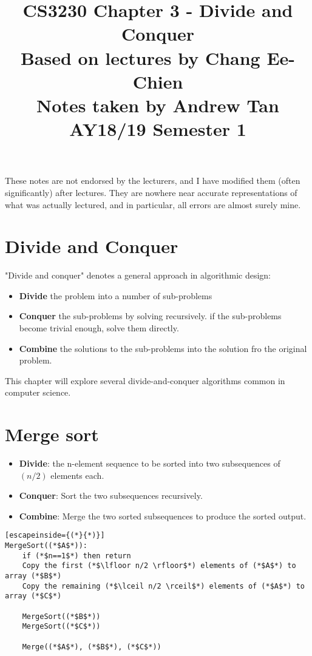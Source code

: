 \documentclass[a4paper]{article}
\title{%
	CS3230 Chapter 3 - Divide and Conquer \\
	\large Based on lectures by Chang Ee-Chien
	\\ Notes taken by Andrew Tan
	\\ AY18/19 Semester 1
	\\ }
\author{}
\date{\vspace{-5ex}}
\begin{document}
\maketitle

\begin{center}\begin{minipage}[c]{0.9\textwidth}\centering\footnotesize These notes are not endorsed by the lecturers, and I have modified them (often significantly) after lectures. They are nowhere near accurate representations of what was actually lectured, and in particular, all errors are almost surely mine.\end{minipage}\end{center}

\section {Divide and Conquer}
"Divide and conquer" denotes a general approach in algorithmic design:
\begin{itemize}
	\item[] \textbf{Divide} the problem into a number of sub-problems
	\item[] \textbf{Conquer} the sub-problems by solving recursively. if the sub-problems become trivial enough, solve them directly.
	\item[] \textbf{Combine} the solutions to the sub-problems into the solution fro the original problem.
\end{itemize}
This chapter will explore several divide-and-conquer algorithms common in computer science.

\section{Merge sort}
\begin{itemize}
	\item[] \textbf{Divide}: the n-element sequence to be sorted into two subsequences of $(n/2)$ elements each.
	\item[] \textbf{Conquer}: Sort the two subsequences recursively.
	\item[] \textbf{Combine}: Merge the two sorted subsequences to produce the sorted output.
\end{itemize}
\begin{lstlisting}[escapeinside={(*}{*)}]
MergeSort((*$A$*)):
	if (*$n==1$*) then return
	Copy the first (*$\lfloor n/2 \rfloor$*) elements of (*$A$*) to array (*$B$*)
	Copy the remaining (*$\lceil n/2 \rceil$*) elements of (*$A$*) to array (*$C$*)
	
	MergeSort((*$B$*))
	MergeSort((*$C$*))
	
	Merge((*$A$*), (*$B$*), (*$C$*))
\end{lstlisting}
\end{document}
